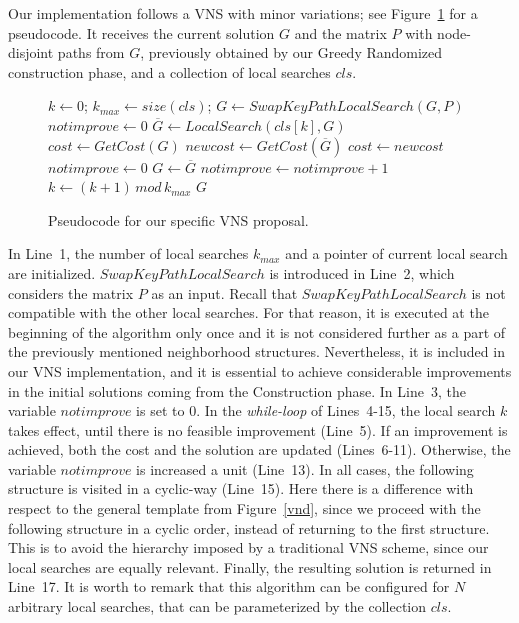Our implementation follows a VNS with minor variations; see Figure~\ref{vns2} for a pseudocode. 
It receives the current solution $G$ and the matrix $P$ with node-disjoint paths from $G$, 
previously obtained by our Greedy Randomized construction phase, and a collection of local searches $cls$. 

\begin{figure}[H]
\begin{algorithm}[H]
\caption{$G = VNS(G,cls,P)$}
\begin{algorithmic}[1]
\STATE $k \leftarrow 0$; $k_{max} \leftarrow size(cls)$;
\STATE $G \leftarrow SwapKeyPathLocalSearch (G,P)$
\STATE $notimprove \leftarrow 0$
\STATE $\overline{G} \leftarrow LocalSearch(cls[k],G)$
\STATE $cost \leftarrow GetCost(G)$
\STATE $newcost \leftarrow GetCost(\overline{G})$
\STATE $cost \leftarrow newcost $
\STATE $notimprove \leftarrow 0$
\STATE $G \leftarrow \overline{G}$
\ELSE
\STATE $notimprove \leftarrow notimprove + 1$
\ENDIF
\STATE $k \leftarrow (k+1) \, mod \, k_{max}$
\ENDWHILE
\RETURN $G$
\end{algorithmic}
\end{algorithm}
\caption{Pseudocode for our specific VNS proposal. \label{vns2}}
\end{figure}


In Line~1, the number of local searches $k_{max}$ and a pointer of current local search are initialized. 
$SwapKeyPathLocalSearch$ is introduced in Line~2, which considers the matrix $P$ 
as an input. Recall that $SwapKeyPathLocalSearch$ is not compatible with the other 
local searches. For that reason, it is executed at the beginning of the algorithm only once and it is 
not considered further as a part of the previously mentioned neighborhood structures. Nevertheless, it 
is included in our VNS implementation, and it is essential to achieve considerable improvements in 
the initial solutions coming from the Construction phase. 
In Line~3, the variable $notimprove$ is set to 0. In the \textit{while-loop} of Lines~4-15, 
the local search $k$ takes effect, until there is no feasible improvement (Line~5). If an improvement 
is achieved, both the cost and the solution are updated (Lines~6-11). Otherwise, the variable $notimprove$ 
is increased a unit (Line~13). In all cases, the following structure is visited in a cyclic-way (Line~15). 
Here there is a difference with respect to the general template from Figure~\ref{vnd}, since 
we proceed with the following structure in a cyclic order, instead of returning to the first structure. This is 
to avoid the hierarchy imposed by a traditional VNS scheme, since our local searches are equally relevant. 
Finally, the resulting solution is returned in Line~17. It is worth to remark that this algorithm 
can be configured for $N$ arbitrary local searches, that can be parameterized by the collection $cls$. 





